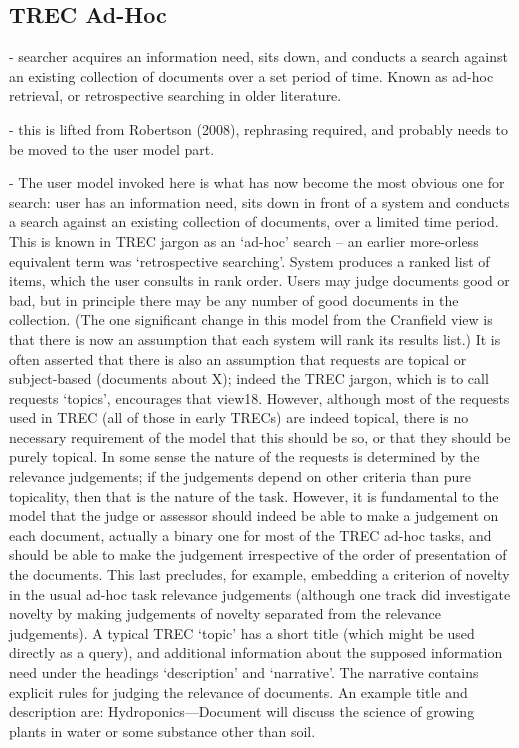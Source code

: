 \subsection{TREC Ad-Hoc}\label{sec:ir_background:user:trec}
- searcher acquires an information need, sits down, and conducts a search against an existing collection of documents over a set period of time. Known as ad-hoc retrieval, or retrospective searching in older literature.

- this is lifted from Robertson (2008), rephrasing required, and probably needs to be moved to the user model part.

- The user model invoked here is what has now become the most obvious one for search: user has an
information need, sits down in front of a system and conducts a search against an existing collection of
documents, over a limited time period. This is known in TREC jargon as an ‘ad-hoc’ search – an earlier more-orless
equivalent term was ‘retrospective searching’. System produces a ranked list of items, which the user consults
in rank order. Users may judge documents good or bad, but in principle there may be any number of good
documents in the collection. (The one significant change in this model from the Cranfield view is that there is now
an assumption that each system will rank its results list.) It is often asserted that there is also an assumption that
requests are topical or subject-based (documents about X); indeed the TREC jargon, which is to call requests
‘topics’, encourages that view18. However, although most of the requests used in TREC (all of those in early
TRECs) are indeed topical, there is no necessary requirement of the model that this should be so, or that they
should be purely topical. In some sense the nature of the requests is determined by the relevance judgements; if
the judgements depend on other criteria than pure topicality, then that is the nature of the task.
However, it is fundamental to the model that the judge or assessor should indeed be able to make a judgement
on each document, actually a binary one for most of the TREC ad-hoc tasks, and should be able to make the
judgement irrespective of the order of presentation of the documents. This last precludes, for example, embedding
a criterion of novelty in the usual ad-hoc task relevance judgements (although one track did investigate novelty by
making judgements of novelty separated from the relevance judgements). A typical TREC ‘topic’ has a short title (which might be used directly as a query), and additional information about the
supposed information need under the headings ‘description’ and ‘narrative’. The narrative contains explicit rules for
judging the relevance of documents. An example title and description are: Hydroponics—Document will discuss the
science of growing plants in water or some substance other than soil. 

